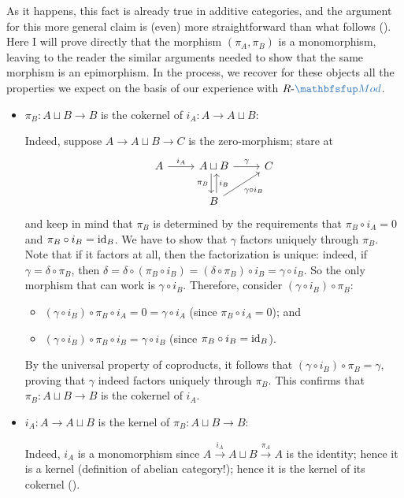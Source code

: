 As it happens, this fact is already true in additive categories, and
the argument for this more general claim is (even) more
straightforward than what follows
(). Here
I will prove directly that the morphism $(\pi_A, \pi_B)$ is a
monomorphism, leaving to the reader the similar arguments needed to
show that the same morphism is an epimorphism. In the process, we
recover for these objects all the properties we expect on the basis of
our experience with $R\text{-}\categ{Mod}$.
\begin{itemize}
\item $\pi_B : A \sqcup B \to B$ is the cokernel of
  $i_A : A \to A \sqcup B$:

  Indeed, suppose $A \to A \sqcup B \to C$ is the zero-morphism; stare
  at
  \[\begin{tikzcd}
      A \arrow[r, "i_A"] & A \sqcup B \arrow[r, "\gamma"]
      \arrow[d, shift right, "\pi_B"'] & C \\
      & B \arrow[u, shift right, "i_B"'] \arrow[ur, "\gamma \circ
      i_B"'] &
    \end{tikzcd}\] and keep in mind that $\pi_B$ is determined by the
  requirements that $\pi_B \circ i_A = 0$ and
  $\pi_B \circ i_B = \operatorname{id}_B$.  We have to show that $\gamma$ factors
  uniquely through $\pi_B$.  Note that if it factors at all, then the
  factorization is unique: indeed, if $\gamma = \delta \circ \pi_B$,
  then
  $\delta = \delta \circ (\pi_B \circ i_B) = (\delta \circ \pi_B)
  \circ i_B = \gamma \circ i_B$.  So the only morphism that can work
  is $\gamma \circ i_B$. Therefore, consider
  $(\gamma \circ i_B) \circ \pi_B$:
  \begin{itemize}
  \item
    $(\gamma \circ i_B) \circ \pi_B \circ i_A = 0 = \gamma \circ i_A$
    (since $\pi_B \circ i_A = 0$); and
  \item $(\gamma \circ i_B) \circ \pi_B \circ i_B = \gamma \circ i_B$
    (since $\pi_B \circ i_B = \operatorname{id}_B$).
  \end{itemize}
  By the universal property of coproducts, it follows that
  $(\gamma \circ i_B) \circ \pi_B = \gamma$, proving that $\gamma$
  indeed factors uniquely through $\pi_B$. This confirms that
  $\pi_B : A \sqcup B \to B$ is the cokernel of $i_A$.

\item $i_A : A \to A \sqcup B$ is the kernel of
  $\pi_B : A \sqcup B \to B$:

  Indeed, $i_A$ is a monomorphism since
  $A \xrightarrow{i_A} A \sqcup B \xrightarrow{\pi_A} A$ is the
  identity; hence it is a kernel (definition of abelian category!);
  hence it is the kernel of its cokernel ().


\end{itemize}
